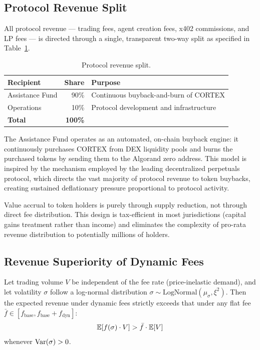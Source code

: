 \subsection{Protocol Revenue Split}
\label{subsec:fee-split}

All protocol revenue --- trading fees, agent creation fees, x402 commissions,
and LP fees --- is directed through a single, transparent two-way split as
specified in Table~\ref{tab:fee-split}.

\begin{table}[H]
\centering
\caption{Protocol revenue split.}
\label{tab:fee-split}
\begin{tabular}{@{}lrl@{}}
\toprule
\textbf{Recipient} & \textbf{Share} & \textbf{Purpose} \\
\midrule
Assistance Fund & 90\% & Continuous buyback-and-burn of CORTEX \\
Operations & 10\% & Protocol development and infrastructure \\
\midrule
\textbf{Total} & \textbf{100\%} & \\
\bottomrule
\end{tabular}
\end{table}

The Assistance Fund operates as an automated, on-chain buyback engine: it
continuously purchases CORTEX from DEX liquidity pools and burns the purchased
tokens by sending them to the Algorand zero address. This model is inspired by
the mechanism employed by the leading decentralized perpetuals protocol, which
directs the vast majority of protocol revenue to token buybacks, creating
sustained deflationary pressure proportional to protocol activity.

Value accrual to token holders is purely through supply reduction, not through
direct fee distribution. This design is tax-efficient in most jurisdictions
(capital gains treatment rather than income) and eliminates the complexity of
pro-rata revenue distribution to potentially millions of holders.

\subsection{Revenue Superiority of Dynamic Fees}
\label{subsec:revenue-superiority}

\begin{proposition}
\label{prop:dynamic-revenue}
Let trading volume $V$ be independent of the fee rate (price-inelastic demand),
and let volatility $\sigma$ follow a log-normal distribution
$\sigma \sim \text{LogNormal}(\mu_\sigma, \xi^2)$. Then the expected revenue
under dynamic fees strictly exceeds that under any flat fee
$\bar{f} \in [f_{\text{base}}, f_{\text{base}} + f_{\text{dyn}}]$:
\begin{equation}
  \mathbb{E}[f(\sigma) \cdot V] > \bar{f} \cdot \mathbb{E}[V]
  \label{eq:revenue-dominance}
\end{equation}
whenever $\mathrm{Var}(\sigma) > 0$.
\end{proposition}

